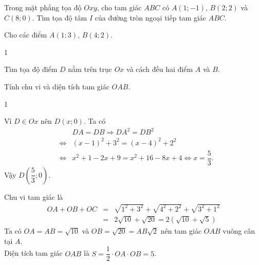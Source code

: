 \begin{bt}%
	Trong mặt phẳng tọa độ $Oxy$, cho tam giác $ABC$ có $A(1;-1)$, $B(2;2)$ và $C(8;0)$. Tìm tọa độ tâm $I$ của đường tròn ngoại tiếp tam giác $ABC$.
\end{bt}

\begin{bt}%
	Cho các điểm $A(1;3)$, $B(4;2)$.
	\begin{enumEX}{1}
		\item Tìm tọa độ điểm $D$ nằm trên trục $Ox$ và cách đều hai điểm $A$ và $B$.
		\item Tính chu vi và diện tích tam giác $OAB$.
	\end{enumEX}
	\loigiai
	{
		\begin{enumEX}{1}
			\item Vì $D\in Ox$ nên $D(x;0)$. Ta có 
			\allowdisplaybreaks 
			\begin{eqnarray*}
				&&DA=DB\Rightarrow DA^2=DB^2\\
				&\Leftrightarrow& (x-1)^2+3^2=(x-4)^2+2^2\\
				&\Leftrightarrow&x^2+1-2x+9=x^2+16-8x+4\Leftrightarrow x=\dfrac{5}{3}.
			\end{eqnarray*}
			Vậy $D\left(\dfrac{5}{3};0\right)$.
			\item Chu vi tam giác là 
			\begin{eqnarray*}
				OA+OB+OC&=&\sqrt{1^2+3^2}+\sqrt{4^2+2^2}+\sqrt{3^2+1^2}\\
				&=&2\sqrt{10}+\sqrt{20}=2(\sqrt{10}+\sqrt{5})
			\end{eqnarray*}
			Ta có $OA=AB=\sqrt{10}$ và $OB=\sqrt{20}=AB\sqrt{2}$ nên tam giác $OAB$ vuông cân tại $A$.\\
			Diện tích tam giác $OAB$ là $S=\dfrac{1}{2}\cdot OA\cdot OB=5$.
		\end{enumEX}	
	}
\end{bt}

